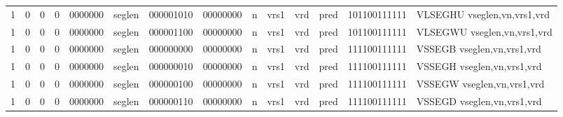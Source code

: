 \begin{landscape}
\begin{table}[p]
\begin{small}
\begin{center}
\begin{tabular}{p{0.08in}@{}p{0.08in}@{}p{0.08in}@{}p{0.08in}@{}p{0.50in}@{}p{0.30in}@{}p{0.08in}@{}p{0.8in}@{}p{0.48in}@{}p{0.32in}@{}p{0.08in}@{}p{0.8in}@{}p{0.8in}@{}p{0.4in}@{}p{0.56in}l}
\multicolumn{1}{|c|}{1} &
\multicolumn{1}{c|}{0} &
\multicolumn{1}{c|}{0} &
\multicolumn{1}{c|}{0} &
\multicolumn{1}{c|}{0000000} &
\multicolumn{1}{c|}{seglen} &
\multicolumn{2}{c|}{000001010} &
\multicolumn{2}{c|}{00000000} &
\multicolumn{1}{c|}{n} &
\multicolumn{1}{c|}{vrs1} &
\multicolumn{1}{c|}{vrd} &
\multicolumn{1}{c|}{pred} &
\multicolumn{1}{c|}{101100111111} & VLSEGHU vseglen,vn,vrs1,vrd \\
\cline{1-15}
  

\multicolumn{1}{|c|}{1} &
\multicolumn{1}{c|}{0} &
\multicolumn{1}{c|}{0} &
\multicolumn{1}{c|}{0} &
\multicolumn{1}{c|}{0000000} &
\multicolumn{1}{c|}{seglen} &
\multicolumn{2}{c|}{000001100} &
\multicolumn{2}{c|}{00000000} &
\multicolumn{1}{c|}{n} &
\multicolumn{1}{c|}{vrs1} &
\multicolumn{1}{c|}{vrd} &
\multicolumn{1}{c|}{pred} &
\multicolumn{1}{c|}{101100111111} & VLSEGWU vseglen,vn,vrs1,vrd \\
\cline{1-15}
  

\multicolumn{1}{|c|}{1} &
\multicolumn{1}{c|}{0} &
\multicolumn{1}{c|}{0} &
\multicolumn{1}{c|}{0} &
\multicolumn{1}{c|}{0000000} &
\multicolumn{1}{c|}{seglen} &
\multicolumn{2}{c|}{000000000} &
\multicolumn{2}{c|}{00000000} &
\multicolumn{1}{c|}{n} &
\multicolumn{1}{c|}{vrs1} &
\multicolumn{1}{c|}{vrd} &
\multicolumn{1}{c|}{pred} &
\multicolumn{1}{c|}{111100111111} & VSSEGB vseglen,vn,vrs1,vrd \\
\cline{1-15}
  

\multicolumn{1}{|c|}{1} &
\multicolumn{1}{c|}{0} &
\multicolumn{1}{c|}{0} &
\multicolumn{1}{c|}{0} &
\multicolumn{1}{c|}{0000000} &
\multicolumn{1}{c|}{seglen} &
\multicolumn{2}{c|}{000000010} &
\multicolumn{2}{c|}{00000000} &
\multicolumn{1}{c|}{n} &
\multicolumn{1}{c|}{vrs1} &
\multicolumn{1}{c|}{vrd} &
\multicolumn{1}{c|}{pred} &
\multicolumn{1}{c|}{111100111111} & VSSEGH vseglen,vn,vrs1,vrd \\
\cline{1-15}
  

\multicolumn{1}{|c|}{1} &
\multicolumn{1}{c|}{0} &
\multicolumn{1}{c|}{0} &
\multicolumn{1}{c|}{0} &
\multicolumn{1}{c|}{0000000} &
\multicolumn{1}{c|}{seglen} &
\multicolumn{2}{c|}{000000100} &
\multicolumn{2}{c|}{00000000} &
\multicolumn{1}{c|}{n} &
\multicolumn{1}{c|}{vrs1} &
\multicolumn{1}{c|}{vrd} &
\multicolumn{1}{c|}{pred} &
\multicolumn{1}{c|}{111100111111} & VSSEGW vseglen,vn,vrs1,vrd \\
\cline{1-15}
  

\multicolumn{1}{|c|}{1} &
\multicolumn{1}{c|}{0} &
\multicolumn{1}{c|}{0} &
\multicolumn{1}{c|}{0} &
\multicolumn{1}{c|}{0000000} &
\multicolumn{1}{c|}{seglen} &
\multicolumn{2}{c|}{000000110} &
\multicolumn{2}{c|}{00000000} &
\multicolumn{1}{c|}{n} &
\multicolumn{1}{c|}{vrs1} &
\multicolumn{1}{c|}{vrd} &
\multicolumn{1}{c|}{pred} &
\multicolumn{1}{c|}{111100111111} & VSSEGD vseglen,vn,vrs1,vrd \\
\cline{1-15}
  


\end{tabular}
\end{center}
\end{small}
\end{table}
\end{landscape}

